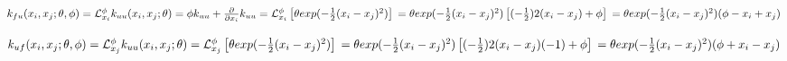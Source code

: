 \documentclass[letterpaper,10pt,english]{sphinxmanual}
\begin{document}
\(k_{fu}(x_i,x_j;\theta,\phi) \\ = \mathcal{L}_{x_i}^\phi k_{uu}(x_i, x_j; \theta) \\ = \phi k_{uu} + \frac{\partial}{\partial x_i}k_{uu} \\ = \mathcal{L}_{x_i}^\phi \left[ \theta exp(-\frac{1}{2}(x_i-x_j)^2) \right] \\ = \theta exp(-\frac{1}{2}(x_i-x_j)^2) \left[ (-\frac{1}{2})2(x_i-x_j) + \phi \right] \\ = \theta exp(-\frac{1}{2}(x_i-x_j)^2)(\phi-x_i+x_j)\)

%
\begin{sphinxVerbatim}[commandchars=\\\{\}]
     
       
    
       
       
           
            \PYG{p}{[}\PYG{p}{]}  \PYG{p}{[}\PYG{p}{]} \PYG{p}{[}\PYG{p}{]}  
     
\end{sphinxVerbatim}

\(k_{uf}(x_i,x_j;\theta,\phi) \\ = \mathcal{L}_{x_j}^\phi k_{uu}(x_i, x_j; \theta) \\ = \mathcal{L}_{x_j}^\phi \left[ \theta exp(-\frac{1}{2}(x_i-x_j)^2) \right] \\ = \theta exp(-\frac{1}{2}(x_i-x_j)^2) \left[ (-\frac{1}{2})2(x_i-x_j)(-1) + \phi \right]\\ = \theta exp(-\frac{1}{2}(x_i-x_j)^2)(\phi+x_i-x_j)\)
\end{document}
